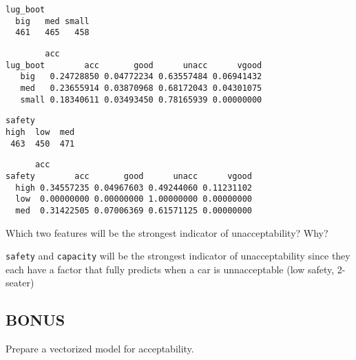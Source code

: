 \documentclass[11pt]{article}
\begin{document}
    
    
    \begin{verbatim}
lug_boot
  big   med small 
  461   465   458 
    \end{verbatim}

    
    
    \begin{verbatim}
        acc
lug_boot        acc       good      unacc      vgood
   big   0.24728850 0.04772234 0.63557484 0.06941432
   med   0.23655914 0.03870968 0.68172043 0.04301075
   small 0.18340611 0.03493450 0.78165939 0.00000000
    \end{verbatim}

    
    
    \begin{verbatim}
safety
high  low  med 
 463  450  471 
    \end{verbatim}

    
    
    \begin{verbatim}
      acc
safety        acc       good      unacc      vgood
  high 0.34557235 0.04967603 0.49244060 0.11231102
  low  0.00000000 0.00000000 1.00000000 0.00000000
  med  0.31422505 0.07006369 0.61571125 0.00000000
    \end{verbatim}

    
    Which two features will be the strongest indicator of unacceptability?
Why?

    \texttt{safety} and \texttt{capacity} will be the strongest indicator of
unacceptability since they each have a factor that fully predicts when a
car is unnacceptable (low safety, 2-seater)

    \hypertarget{bonus}{%
\subsection{BONUS}\label{bonus}}

Prepare a vectorized model for acceptability.


    
    
    
    
\end{document}
